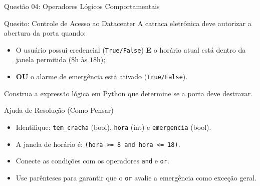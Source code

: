 \begin{frame}{Questão 04: Operadores Lógicos Comportamentais}
    \begin{block}{Quesito: Controle de Acesso ao Datacenter}
        A catraca eletrônica deve autorizar a abertura da porta quando:
        \begin{itemize}
            \item O usuário possui credencial (\texttt{True/False}) \textbf{E} o horário atual está dentro da janela permitida ($8\text{h}$ às $18\text{h}$);
            \item \textbf{OU} o alarme de emergência está ativado (\texttt{True/False}).
        \end{itemize}
        Construa a expressão lógica em Python que determine se a porta deve destravar.
    \end{block}

    \begin{exampleblock}{Ajuda de Resolução (Como Pensar)}
        \begin{itemize}
            \item Identifique: \texttt{tem\_cracha} (bool), \texttt{hora} (int) e \texttt{emergencia} (bool).
            \item A janela de horário é: \texttt{(hora >= 8 and hora <= 18)}.
            \item Conecte as condições com os operadores \texttt{and} e \texttt{or}.
            \item Use parênteses para garantir que o \texttt{or} avalie a emergência como exceção geral.
        \end{itemize}
    \end{exampleblock}
\end{frame}

